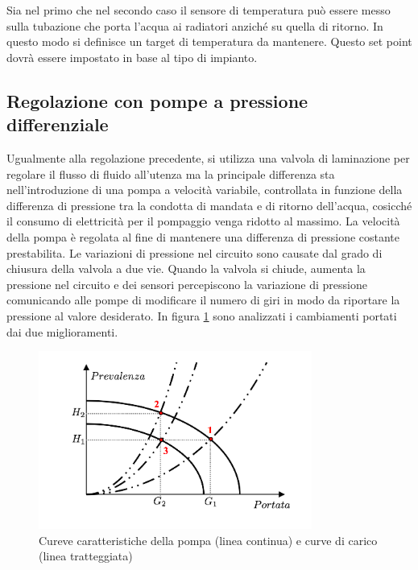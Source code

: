 \documentclass[laurea,oneside,11pt]{USiena_tesiLM}
\begin{document}
Sia nel primo che nel secondo caso il sensore di temperatura può essere messo sulla tubazione che porta l'acqua ai radiatori anziché su quella di ritorno. In questo modo si definisce un target di temperatura da mantenere. Questo set point dovrà essere impostato in base al tipo di impianto.

\subsection{Regolazione con pompe a pressione differenziale}
Ugualmente alla regolazione precedente, si utilizza una valvola di laminazione per regolare il flusso di fluido all'utenza ma la principale differenza sta nell'introduzione di una pompa a velocità variabile, controllata in funzione della differenza di pressione tra la condotta di mandata e di ritorno dell'acqua, cosicché il consumo di elettricità per il pompaggio venga ridotto al massimo.
 La velocità della pompa è regolata al fine di mantenere una differenza di pressione costante prestabilita. Le variazioni di pressione nel circuito sono causate dal grado di chiusura della valvola a due vie. Quando la valvola si chiude, aumenta la pressione nel circuito e dei sensori percepiscono la variazione di pressione comunicando alle pompe di modificare il numero di giri in modo da riportare la pressione al valore desiderato. In figura \ref{fig:giri_variabili} sono analizzati i cambiamenti portati dai due miglioramenti.

\begin{figure}[!ht]
\centering
\includegraphics[width=0.8\textwidth]{figure/giri_variabili}
\caption{Cureve caratteristiche della pompa (linea continua) e curve di carico (linea tratteggiata)}
\label{fig:giri_variabili}
\end{figure}
\end{document}
